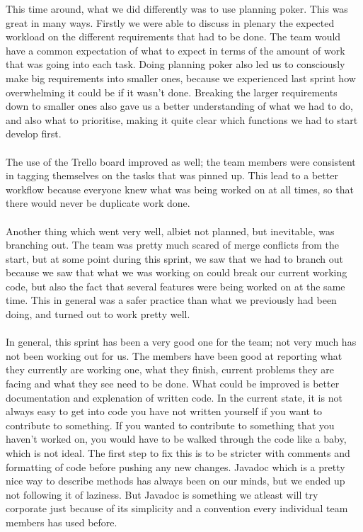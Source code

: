 \documentclass{article}
\begin{document}
\maketitle
This time around, what we did differently was to use planning poker. This was great in many ways. Firstly we were able to discuss in plenary the expected workload on the different requirements that had to be done. The team would have a common expectation of what to expect in terms of the amount of work that was going into each task. Doing planning poker also led us to consciously make big requirements into smaller ones, because we experienced last sprint how overwhelming it could be if it wasn't done. Breaking the larger requirements down to smaller ones also gave us a better understanding of what we had to do, and also what to prioritise, making it quite clear which functions we had to start develop first.\\\\
The use of the Trello board improved as well; the team members were consistent in tagging themselves on the tasks that was pinned up. This lead to a better workflow because everyone knew what was being worked on at all times, so that there would never be duplicate work done.\\\\
Another thing which went very well, albiet not planned, but inevitable, was branching out. The team was pretty much scared of merge conflicts from the start, but at some point during this sprint, we saw that we had to branch out because we saw that what we was working on could break our current working code, but also the fact that several features were being worked on at the same time. This in general was a safer practice than what we previously had been doing, and turned out to work pretty well.\\\\
In general, this sprint has been a very good one for the team; not very much has not been working out for us. The members have been good at reporting what they currently are working one, what they finish, current problems they are facing and what they see need to be done. What could be improved is better documentation and explenation of written code. In the current state, it is not always easy to get into code you have not written yourself if you want to contribute to something. If you wanted to contribute to something that you haven't worked on, you would have to be walked through the code like a baby, which is not ideal. The first step to fix this is to be stricter with comments and formatting of code before pushing any new changes. Javadoc which is a pretty nice way to describe methods has always been on our minds, but we ended up not following it of laziness. But Javadoc is something we atleast will try corporate just because of its simplicity and a convention every individual team members has used before.
\end{document}
